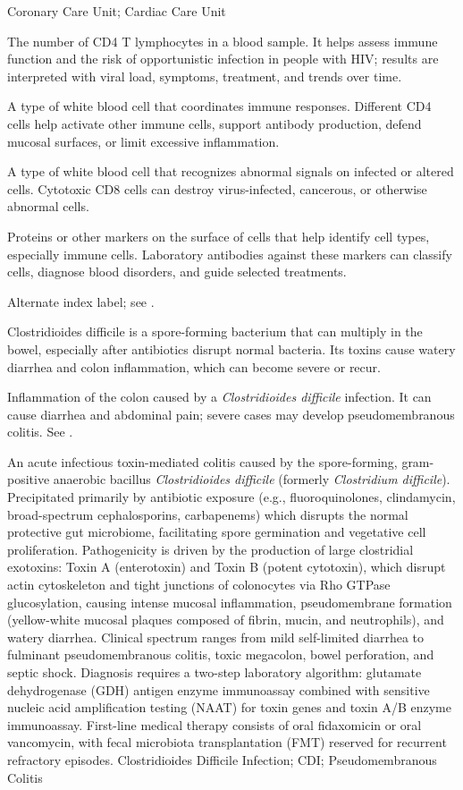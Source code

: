 \synonyms
Coronary Care Unit; Cardiac Care Unit

 The number of CD4 T lymphocytes in a blood sample. It helps assess immune function and the risk of opportunistic infection in people with HIV; results are interpreted with viral load, symptoms, treatment, and trends over time.

 A type of white blood cell that coordinates immune responses. Different CD4 cells help activate other immune cells, support antibody production, defend mucosal surfaces, or limit excessive inflammation.

 A type of white blood cell that recognizes abnormal signals on infected or altered cells. Cytotoxic CD8 cells can destroy virus-infected, cancerous, or otherwise abnormal cells.

 Proteins or other markers on the surface of cells that help identify cell types, especially immune cells. Laboratory antibodies against these markers can classify cells, diagnose blood disorders, and guide selected treatments.

 Alternate index label; see .

 Clostridioides difficile is a spore-forming bacterium that can multiply in the bowel, especially after antibiotics disrupt normal bacteria. Its toxins cause watery diarrhea and colon inflammation, which can become severe or recur.

 Inflammation of the colon caused by a
\textit{Clostridioides difficile} infection. It can cause diarrhea and
abdominal pain; severe cases may develop pseudomembranous colitis. See
.

 An acute infectious toxin-mediated colitis caused by the spore-forming, gram-positive anaerobic bacillus \textit{Clostridioides difficile} (formerly \textit{Clostridium difficile}). Precipitated primarily by antibiotic exposure (e.g., fluoroquinolones, clindamycin, broad-spectrum cephalosporins, carbapenems) which disrupts the normal protective gut microbiome, facilitating spore germination and vegetative cell proliferation. Pathogenicity is driven by the production of large clostridial exotoxins: Toxin A (enterotoxin) and Toxin B (potent cytotoxin), which disrupt actin cytoskeleton and tight junctions of colonocytes via Rho GTPase glucosylation, causing intense mucosal inflammation, pseudomembrane formation (yellow-white mucosal plaques composed of fibrin, mucin, and neutrophils), and watery diarrhea. Clinical spectrum ranges from mild self-limited diarrhea to fulminant pseudomembranous colitis, toxic megacolon, bowel perforation, and septic shock. Diagnosis requires a two-step laboratory algorithm: glutamate dehydrogenase (GDH) antigen enzyme immunoassay combined with sensitive nucleic acid amplification testing (NAAT) for toxin genes and toxin A/B enzyme immunoassay. First-line medical therapy consists of oral fidaxomicin or oral vancomycin, with fecal microbiota transplantation (FMT) reserved for recurrent refractory episodes.
\synonyms
Clostridioides Difficile Infection; CDI; Pseudomembranous Colitis

